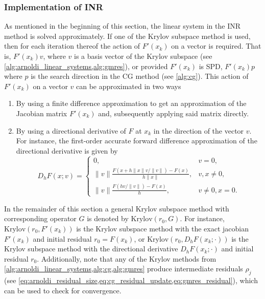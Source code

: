 \subsubsection{Implementation of INR}
As mentioned in the beginning of this section, the linear system in the INR method is solved approximately. If one of the Krylov subspace method is used, then for each iteration thereof the action of $F'(x_k)$ on a vector is required. That is, $F'(x_k)v$, where $v$ is a basis vector of the Krylov subspace (see \cref{alg:arnoldi_linear_systems,alg:gmres}), or provided $F'(x_k)$ is SPD, $F'(x_k)p$ where $p$ is the search direction in the CG method (see \cref{alg:cg}). This action of $F'(x_k)$ on a vector $v$ can be approximated in two ways
\begin{enumerate}
  \item By using a finite difference approximation to get an approximation of the Jacobian matrix $F'(x_k)$ and, subsequently applying said matrix directly.
  \item By using a directional derivative of $F$ at $x_k$ in the direction of the vector $v$. For instance, the first-order accurate forward difference approximation of the directional derivative is given by
        \begin{equation}
          D_h F(x ; v) =
          \begin{cases*}
            0,                                              & v = 0,           \\
            \|v\| \frac{F(x + h\|x\|v/\|v\|)-F(x)}{h\|x\|}, & v,x \neq 0,      \\
            \|v\| \frac{F(h v/\|v\|)-F(x)}{h},              & v \neq 0, x = 0.
          \end{cases*}
        \end{equation}
\end{enumerate}
In the remainder of this section a general Krylov subspace method with corresponding operator $G$ is denoted by $\text{Krylov}(r_0, G)$. For instance, $\text{Krylov}(r_0, F'(x_k))$ is the Krylov subspace method with the exact jacobian $F'(x_k)$ and initial residual $r_0 = F(x_k)$, or $\text{Krylov}(r_0, D_h F(x_k; \cdot))$ is the Krylov subspace method with the directional derivative $D_h F(x_k; \cdot)$ and initial residual $r_0$. Additionally, note that any of the Krylov methods from \cref{alg:arnoldi_linear_systems,alg:cg,alg:gmres} produce intermediate residuals $\rho_j$ (see \cref{eq:arnoldi_residual_size,eq:cg_residual_update,eq:gmres_residual}), which can be used to check for convergence.

